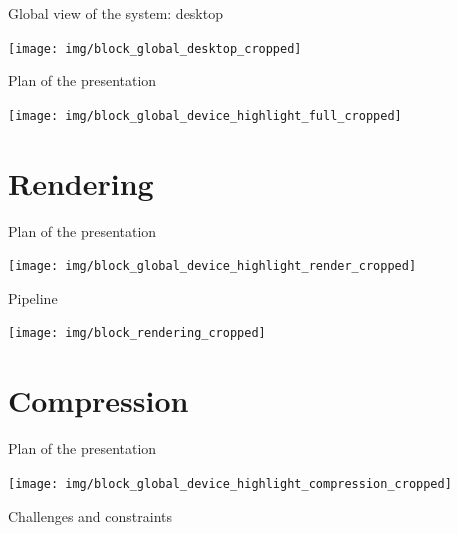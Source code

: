 \documentclass[10pt]{beamer}
\begin{document}
\begin{frame}{Global view of the system: desktop}
    \begin{center}
        \texttt{[image: img/block\_global\_desktop\_cropped]}
    \end{center}
\end{frame}

\begin{frame}{Plan of the presentation}
    \begin{center}
        \texttt{[image: img/block\_global\_device\_highlight\_full\_cropped]}
    \end{center}
\end{frame}

\section{Rendering}
\begin{frame}{Plan of the presentation}
    \begin{center}
        \texttt{[image: img/block\_global\_device\_highlight\_render\_cropped]}
    \end{center}
\end{frame}

\begin{frame}{Pipeline}
    \begin{center}
        \texttt{[image: img/block\_rendering\_cropped]}
    \end{center}
\end{frame}

\section{Compression}
\begin{frame}{Plan of the presentation}
    \begin{center}
        \texttt{[image: img/block\_global\_device\_highlight\_compression\_cropped]}
    \end{center}
\end{frame}

\begin{frame}{Challenges and constraints}
    
\end{frame}
\end{document}
